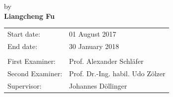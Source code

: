 \begin{titlepage}
\begin{center}
\vspace{0.6cm}
{
\Large by \\[.5cm] 
{\bf \LARGE \huge Liangcheng Fu}\\[1.5cm]
}

\vfill
\begin{tabular}{ll}
Start date:& 01 August 2017\\
End date:& 30 January 2018\\
\\
First Examiner:&  Prof. Alexander Schl\"afer\\
Second Examiner:&  Prof. Dr.-Ing. habil. Udo Z\"olzer\\
Supervisor:&  Johannes D\"ollinger\\
\end{tabular}
\end{center}
\vspace{2cm}

\end{titlepage}

